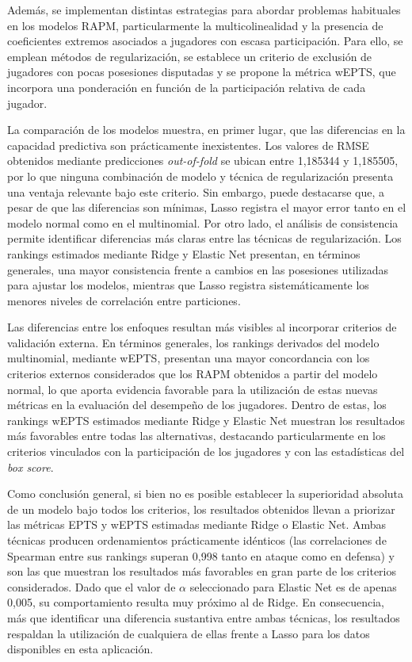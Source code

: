 \documentclass[
  12pt,
]{article}
\begin{document}
Además, se implementan distintas estrategias para abordar problemas
habituales en los modelos RAPM, particularmente la multicolinealidad y
la presencia de coeficientes extremos asociados a jugadores con escasa
participación. Para ello, se emplean métodos de regularización, se
establece un criterio de exclusión de jugadores con pocas posesiones
disputadas y se propone la métrica wEPTS, que incorpora una ponderación
en función de la participación relativa de cada jugador.

La comparación de los modelos muestra, en primer lugar, que las
diferencias en la capacidad predictiva son prácticamente inexistentes.
Los valores de RMSE obtenidos mediante predicciones \emph{out-of-fold}
se ubican entre 1,185344 y 1,185505, por lo que ninguna combinación de
modelo y técnica de regularización presenta una ventaja relevante bajo
este criterio. Sin embargo, puede destacarse que, a pesar de que las
diferencias son mínimas, Lasso registra el mayor error tanto en el
modelo normal como en el multinomial. Por otro lado, el análisis de
consistencia permite identificar diferencias más claras entre las
técnicas de regularización. Los rankings estimados mediante Ridge y
Elastic Net presentan, en términos generales, una mayor consistencia
frente a cambios en las posesiones utilizadas para ajustar los modelos,
mientras que Lasso registra sistemáticamente los menores niveles de
correlación entre particiones.

Las diferencias entre los enfoques resultan más visibles al incorporar
criterios de validación externa. En términos generales, los rankings
derivados del modelo multinomial, mediante wEPTS, presentan una mayor
concordancia con los criterios externos considerados que los RAPM
obtenidos a partir del modelo normal, lo que aporta evidencia favorable
para la utilización de estas nuevas métricas en la evaluación del
desempeño de los jugadores. Dentro de estas, los rankings wEPTS
estimados mediante Ridge y Elastic Net muestran los resultados más
favorables entre todas las alternativas, destacando particularmente en
los criterios vinculados con la participación de los jugadores y con las
estadísticas del \emph{box score}.

Como conclusión general, si bien no es posible establecer la
superioridad absoluta de un modelo bajo todos los criterios, los
resultados obtenidos llevan a priorizar las métricas EPTS y wEPTS
estimadas mediante Ridge o Elastic Net. Ambas técnicas producen
ordenamientos prácticamente idénticos (las correlaciones de Spearman
entre sus rankings superan 0,998 tanto en ataque como en defensa) y son
las que muestran los resultados más favorables en gran parte de los
criterios considerados. Dado que el valor de \(\alpha\) seleccionado
para Elastic Net es de apenas 0,005, su comportamiento resulta muy
próximo al de Ridge. En consecuencia, más que identificar una diferencia
sustantiva entre ambas técnicas, los resultados respaldan la utilización
de cualquiera de ellas frente a Lasso para los datos disponibles en esta
aplicación.
\end{document}
